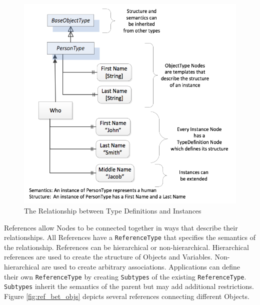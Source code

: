 \begin{figure}[h]
  \centering
  \includegraphics[width=1.0\textwidth]{diagrams/RelsBetweenTypesAndInstances.png}
  \caption{The Relationship between Type Definitions and Instances }
  \label{fig:rel_type_inst}
\end{figure}

References allow Nodes to be connected together in ways that describe their relationships. All References have a  \texttt{ReferenceType} that specifies the semantics of the relationship. References can be hierarchical or non-hierarchical. Hierarchical references are used to create the structure of Objects and Variables. Non-hierarchical are used to create arbitrary associations. Applications can define their own  \texttt{ReferenceType} by creating  \texttt{Subtypes} of the existing \texttt{ReferenceType}.  \texttt{Subtypes} inherit the semantics of the parent but may add additional restrictions. Figure \ref{fig:ref_bet_objs} depicts several references connecting different Objects.

